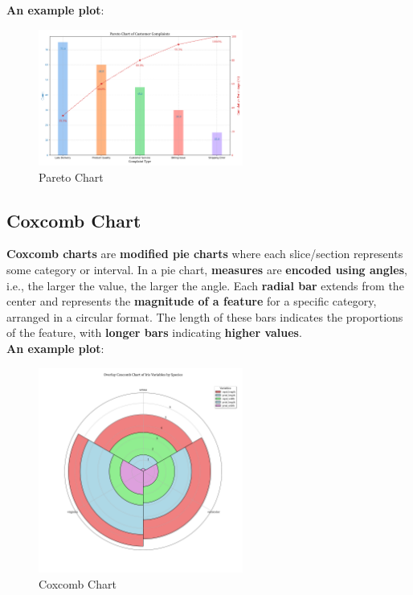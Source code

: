 \documentclass{article}
\begin{document}
\textbf{An example plot}:
\begin{figure}[H]
    \centering
    \includegraphics[width=0.6\textwidth]{assets/plots/pareto_chart.png}
    \caption{Pareto Chart}
    \label{fig:pareto_chart}
\end{figure}

\subsection{Coxcomb Chart}

\textbf{Coxcomb charts} are \textbf{modified pie charts} where each slice/section represents some category or interval. In a pie chart, \textbf{measures} are \textbf{encoded using angles}, i.e., the larger the value, the larger the angle. Each \textbf{radial bar} extends from the center and represents the \textbf{magnitude of a feature} for a specific category, arranged in a circular format. The length of these bars indicates the proportions of the feature, with \textbf{longer bars} indicating \textbf{higher values}.
\\[5pt]
\textbf{An example plot}:
\begin{figure}[H]
    \centering
    \includegraphics[width=0.6\textwidth]{assets/plots/coxcomb_chart.png}
    \caption{Coxcomb Chart}
    \label{fig:coxcomb_chart}
\end{figure}
\end{document}
